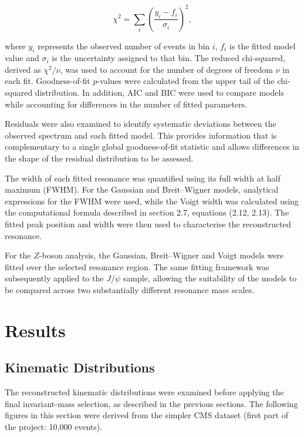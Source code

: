 \documentclass[11pt, a4paper]{article}
\numberwithin{equation}{section}
\begin{document}
\begin{equation} \chi^2 =\sum_i\left(\frac{y_i-f_i}{\sigma_i}\right)^2, \end{equation}

where $y_i$ represents the observed number of events in bin $i$, $f_i$ is the fitted model value and $\sigma_i$ is the uncertainty assigned to that bin. The reduced chi-squared, derived as $\chi^2 / \nu$, was used to account for the number of degrees of freedom $\nu$ in each fit. Goodness-of-fit $p$-values were calculated from the upper tail of the chi-squared distribution. In addition, AIC \cite{akaike1974aic} and BIC \cite{schwarz1978bic} were used to compare models while accounting for differences in the number of fitted parameters.

Residuals were also examined to identify systematic deviations between the observed spectrum and each fitted model. This provides information that is complementary to a single global goodness-of-fit statistic and allows differences in the shape of the residual distribution to be assessed.

The width of each fitted resonance was quantified using its full width at half maximum (FWHM). For the Gaussian and Breit--Wigner models, analytical expressions for the FWHM were used, while the Voigt width was calculated using the computational formula described in section 2.7, equations (2.12, 2.13). The fitted peak position and width were then used to characterise the reconstructed resonance.

For the $Z$-boson analysis, the Gaussian, Breit--Wigner and Voigt models were fitted over the selected resonance region. The same fitting framework was subsequently applied to the $J/\psi$ sample, allowing the suitability of the models to be compared across two substantially different resonance mass scales.

\section{Results}

\subsection{Kinematic Distributions}

The reconstructed kinematic distributions were examined before applying the final invariant-mass selection, as described in the previous sections. The following figures in this section were derived from the simpler CMS dataset (first part of the project: 10,000 events).
\end{document}
